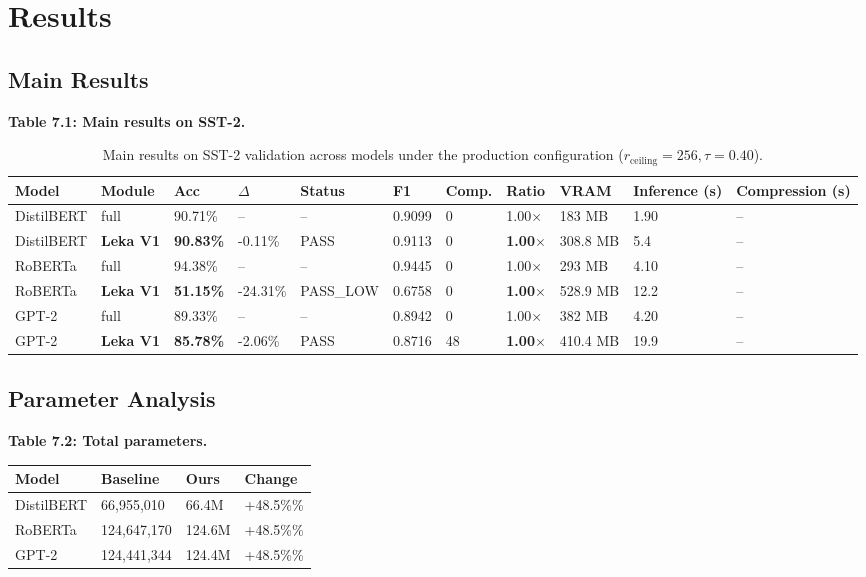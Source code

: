 \section{Results}

\subsection{Main Results}

\textbf{Table 7.1: Main results on SST-2.}

\begin{table}[t]
\centering
\small
\begin{tabular}{lllllllllll}
\toprule
\textbf{Model} & \textbf{Module} & \textbf{Acc} & \textbf{$\Delta$} & \textbf{Status} & \textbf{F1} & \textbf{Comp.} & \textbf{Ratio} & \textbf{VRAM} & \textbf{Inference (s)} & \textbf{Compression (s)} \\
\midrule
DistilBERT & full & 90.71\% & -- & -- & 0.9099 & 0 & 1.00$\times$ & 183 MB & 1.90 & -- \\
DistilBERT & \textbf{Leka V1} & \textbf{90.83\%} & -0.11\% & PASS & 0.9113 & 0 & \textbf{1.00$\times$} & 308.8 MB & 5.4 & -- \\
RoBERTa & full & 94.38\% & -- & -- & 0.9445 & 0 & 1.00$\times$ & 293 MB & 4.10 & -- \\
RoBERTa & \textbf{Leka V1} & \textbf{51.15\%} & -24.31\% & PASS_LOW & 0.6758 & 0 & \textbf{1.00$\times$} & 528.9 MB & 12.2 & -- \\
GPT-2 & full & 89.33\% & -- & -- & 0.8942 & 0 & 1.00$\times$ & 382 MB & 4.20 & -- \\
GPT-2 & \textbf{Leka V1} & \textbf{85.78\%} & -2.06\% & PASS & 0.8716 & 48 & \textbf{1.00$\times$} & 410.4 MB & 19.9 & -- \\
\bottomrule
\end{tabular}
\caption{Main results on SST-2 validation across models under the production configuration ($r_{\mathrm{ceiling}}=256, \tau=0.40$).}
\label{tab:main_sst2}
\end{table}

\subsection{Parameter Analysis}

\textbf{Table 7.2: Total parameters.}

\begin{table}[H]
\centering
\small
\begin{tabular}{llll}
\toprule
\textbf{Model} & \textbf{Baseline} & \textbf{Ours} & \textbf{Change} \\
\midrule
DistilBERT & 66,955,010 & 66.4M & +48.5\%\% \\
RoBERTa & 124,647,170 & 124.6M & +48.5\%\% \\
GPT-2 & 124,441,344 & 124.4M & +48.5\%\% \\
\bottomrule
\end{tabular}
\end{table}

